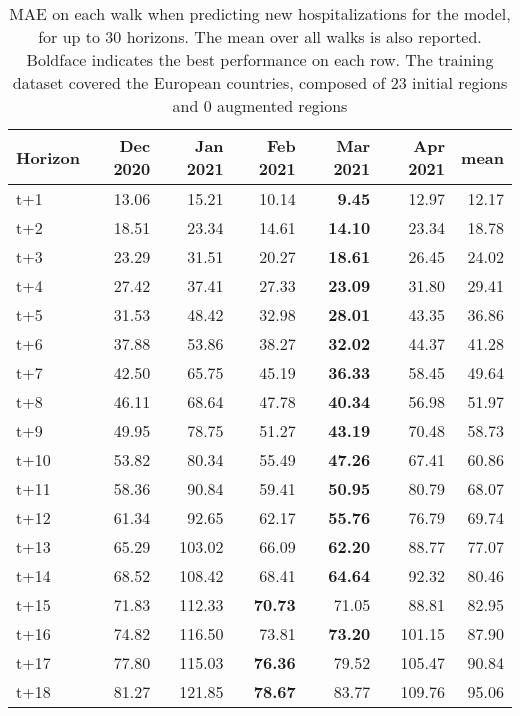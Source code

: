 \begin{table}[H]
\centering
\caption{MAE on each walk when predicting new hospitalizations for the model, for up to 30 horizons. The mean over all walks is also reported. Boldface indicates the best performance on each row. The training dataset covered the European countries, composed of 23 initial regions and 0 augmented regions }
\label{tab:MAE_walk_dense_model}
\begin{tabular}{lrrrrrr}
\toprule
Horizon &  Dec 2020 &  Jan 2021 &  Feb 2021 &  Mar 2021 &  Apr 2021 &   mean \\
\midrule
t+1  & 13.06  & 15.21  & 10.14  & \textbf{9.45}  & 12.97  & 12.17  \\
t+2  & 18.51  & 23.34  & 14.61  & \textbf{14.10}  & 23.34  & 18.78  \\
t+3  & 23.29  & 31.51  & 20.27  & \textbf{18.61}  & 26.45  & 24.02  \\
t+4  & 27.42  & 37.41  & 27.33  & \textbf{23.09}  & 31.80  & 29.41  \\
t+5  & 31.53  & 48.42  & 32.98  & \textbf{28.01}  & 43.35  & 36.86  \\
t+6  & 37.88  & 53.86  & 38.27  & \textbf{32.02}  & 44.37  & 41.28  \\
t+7  & 42.50  & 65.75  & 45.19  & \textbf{36.33}  & 58.45  & 49.64  \\
t+8  & 46.11  & 68.64  & 47.78  & \textbf{40.34}  & 56.98  & 51.97  \\
t+9  & 49.95  & 78.75  & 51.27  & \textbf{43.19}  & 70.48  & 58.73  \\
t+10  & 53.82  & 80.34  & 55.49  & \textbf{47.26}  & 67.41  & 60.86  \\
t+11  & 58.36  & 90.84  & 59.41  & \textbf{50.95}  & 80.79  & 68.07  \\
t+12  & 61.34  & 92.65  & 62.17  & \textbf{55.76}  & 76.79  & 69.74  \\
t+13  & 65.29  & 103.02  & 66.09  & \textbf{62.20}  & 88.77  & 77.07  \\
t+14  & 68.52  & 108.42  & 68.41  & \textbf{64.64}  & 92.32  & 80.46  \\
t+15  & 71.83  & 112.33  & \textbf{70.73}  & 71.05  & 88.81  & 82.95  \\
t+16  & 74.82  & 116.50  & 73.81  & \textbf{73.20}  & 101.15  & 87.90  \\
t+17  & 77.80  & 115.03  & \textbf{76.36}  & 79.52  & 105.47  & 90.84  \\
t+18  & 81.27  & 121.85  & \textbf{78.67}  & 83.77  & 109.76  & 95.06  \\

\end{tabular}
\end{table}
